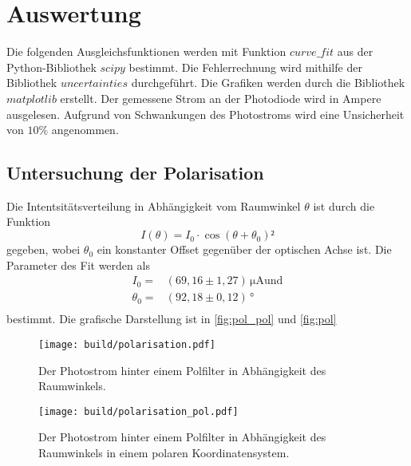 \section{Auswertung}
\label{sec:auswertung}

Die folgenden Ausgleichsfunktionen werden mit Funktion $curve\_fit$ aus der Python\cite{py}-Bibliothek $scipy$\cite{2020SciPy-NMeth} bestimmt.
Die Fehlerrechnung wird mithilfe der Bibliothek $uncertainties$ \cite{unp} durchgeführt.
Die Grafiken werden durch die Bibliothek $matplotlib$\cite{Hunter:2007} erstellt. Der gemessene Strom an der Photodiode wird in Ampere ausgelesen.  
Aufgrund von Schwankungen des Photostroms wird eine Unsicherheit von $10 \%$ angenommen.

\subsection{Untersuchung der Polarisation}
\label{sec:Polarisation}

Die Intentsitätsverteilung in Abhängigkeit vom Raumwinkel $\theta$ ist durch die Funktion
\begin{equation*}
    I(\theta) = I_0 \cdot \cos(\theta + \theta_0)² %
\end{equation*}
gegeben, wobei $\theta_0 $ ein konstanter Offset gegenüber der optischen Achse ist. 
Die Parameter des Fit werden als
\begin{align*}
    I_0      =& (69,16 \pm    1,27) \, \unit{\micro\ampere}   \text{und}  \\
    \theta_0 =& (92,18 \pm    0,12) \, °                        \\
\end{align*}
bestimmt. Die grafische Darstellung ist in  \autoref{fig:pol_pol} und \autoref{fig:pol}

\begin{figure}[H]
    \centering
    \texttt{[image: build/polarisation.pdf]}
    \caption{Der Photostrom hinter einem Polfilter in Abhängigkeit des Raumwinkels.}
    \label{fig:pol}
\end{figure}

\begin{figure}[H]
    \centering
    \texttt{[image: build/polarisation\_pol.pdf]}
    \caption{Der Photostrom hinter einem Polfilter in Abhängigkeit des Raumwinkels in einem polaren Koordinatensystem.}
    \label{fig:pol_pol}
\end{figure}

